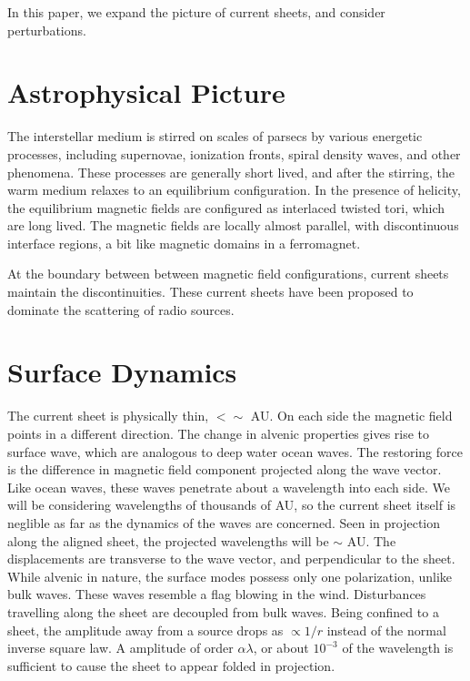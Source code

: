 \documentclass[useAMS,usenatbib]{mn2e}
\begin{document}
In this paper, we expand the picture of current sheets, and consider
perturbations.


\section{Astrophysical Picture}

The interstellar medium is stirred on scales of parsecs by various
energetic processes, including supernovae, ionization fronts, spiral
density waves, and other phenomena.  These processes are generally
short lived, and after the stirring, the warm medium relaxes to an
equilibrium configuration.  In the presence of helicity, the
equilibrium magnetic fields are configured as interlaced twisted tori,
which are long lived\citep{2004Natur.431..819B}.  The magnetic fields
are locally almost parallel, with discontinuous interface regions, a
bit like magnetic domains in a ferromagnet\cite{2009arXiv0909.1815G}.

At the boundary between between magnetic field configurations, current
sheets maintain the discontinuities.  These current sheets have been
proposed to dominate the scattering of radio
sources\citep{2006ApJ...640L.159G}.

\section{Surface Dynamics}

The current sheet is physically thin, $< \sim $ AU.  On each side the
magnetic field points in a different direction.  The change in alvenic
properties gives rise to surface
wave\citep{1991SoPh..133..263J,2009GApFD.103...89J}, which are
analogous to deep water ocean waves.  The restoring force is the
difference in magnetic field component projected along the wave
vector.  Like ocean waves, these waves penetrate about a wavelength
into each side.  We will be considering wavelengths of thousands of
AU, so the current sheet itself is neglible as far as the dynamics of
the waves are concerned.  Seen in projection along the aligned sheet,
the projected wavelengths will be $\sim $ AU.  The displacements are
transverse to the wave vector, and perpendicular to the sheet.  While
alvenic in nature, the surface modes possess only one polarization,
unlike bulk waves.  These waves resemble a flag blowing in the wind.
Disturbances travelling along the sheet are decoupled from bulk waves.
Being confined to a sheet, the amplitude away from a source drops as
$\propto 1/r$ instead of the normal inverse square law.  A amplitude
of order $\alpha \lambda$, or about $10^{-3}$ of the wavelength is
sufficient to cause the sheet to appear folded in projection.
\end{document}
